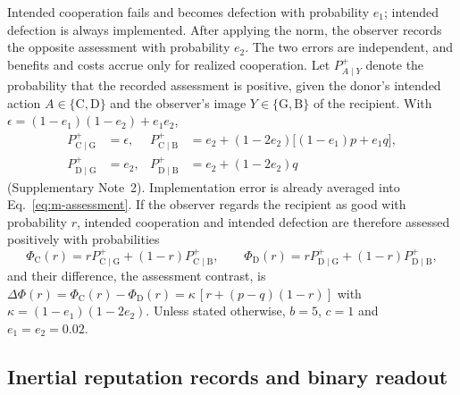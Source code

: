Intended cooperation fails and becomes defection with probability $e_1$;
intended defection is always implemented. After applying the norm, the
observer records the opposite assessment with probability $e_2$. The two errors
are independent, and benefits and costs accrue only for realized cooperation.
Let $P^+_{A\mid Y}$ denote the probability that the recorded assessment is
positive, given the donor's intended action $A\in\{\mathrm C,\mathrm D\}$ and
the observer's image $Y\in\{\mathrm G,\mathrm B\}$ of the recipient. With
$\epsilon=(1-e_1)(1-e_2)+e_1e_2$,
\begin{equation}
\begin{aligned}
P^+_{\mathrm C\mid\mathrm G}&=\epsilon, &
P^+_{\mathrm C\mid\mathrm B}&=e_2+(1-2e_2)\bigl[(1-e_1)p+e_1q\bigr],\\
P^+_{\mathrm D\mid\mathrm G}&=e_2, &
P^+_{\mathrm D\mid\mathrm B}&=e_2+(1-2e_2)q
\end{aligned}
\label{eq:m-assessment}
\end{equation}
(Supplementary Note~2). Implementation error is already averaged into
Eq.~\eqref{eq:m-assessment}. If the observer regards the recipient as good with
probability $r$, intended cooperation and intended defection are therefore
assessed positively with probabilities
\begin{equation}
\Phi_{\mathrm C}(r)=rP^+_{\mathrm C\mid\mathrm G}+(1-r)P^+_{\mathrm C\mid\mathrm B},
\qquad
\Phi_{\mathrm D}(r)=rP^+_{\mathrm D\mid\mathrm G}+(1-r)P^+_{\mathrm D\mid\mathrm B},
\label{eq:m-action-assessment}
\end{equation}
and their difference, the assessment contrast, is
$\Delta\Phi(r)=\Phi_{\mathrm C}(r)-\Phi_{\mathrm D}(r)=\kappa\,[r+(p-q)(1-r)]$
with $\kappa=(1-e_1)(1-2e_2)$. Unless stated otherwise, $b=5$, $c=1$ and
$e_1=e_2=0.02$.

\subsection*{Inertial reputation records and binary readout}


